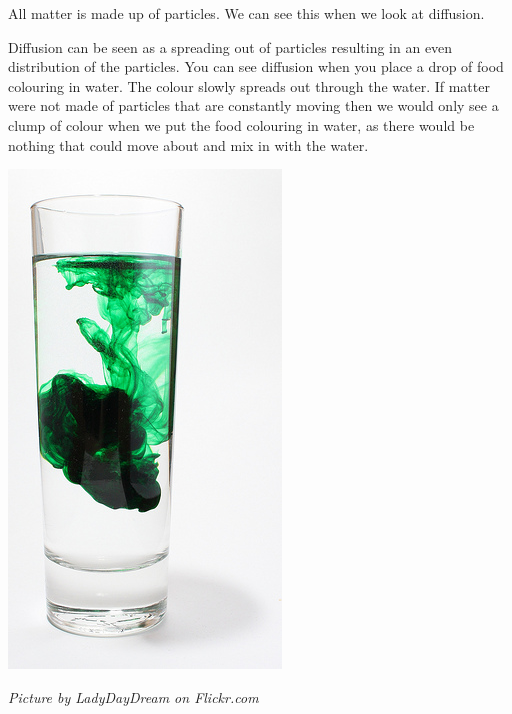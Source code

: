 \label{m38736*id324876121}All matter is made up of particles. We can see this when we look at diffusion. \par
{} 
\begin{minipage}{.5\textwidth}
Diffusion can be seen as a spreading out of particles resulting in an even distribution of the particles. You can see diffusion when you place a drop of food colouring in water. The colour slowly spreads out through the water. If matter were not made of particles that are constantly moving then we would only see a clump of colour when we put the food colouring in water, as there would be nothing that could move about and mix in with the water.
\end{minipage}
\begin{minipage}{.5\textwidth}
\begin{center}
 \includegraphics[height=.5\textwidth]{photos/diffusionby-LadyDayDream-flickr.jpg}\par
\textit{Picture by LadyDayDream on Flickr.com}
\end{center}
\end{minipage}

